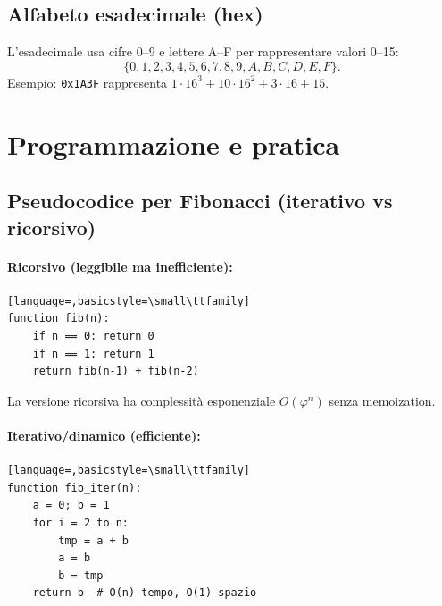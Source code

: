\documentclass[11pt,a4paper]{article}
\let\oldsection\section
\renewcommand{\section}{\clearpage\oldsection}
\begin{document}
\subsection{Alfabeto esadecimale (hex)}
L'esadecimale usa cifre 0--9 e lettere A--F per rappresentare valori 0--15:
\[
\{0,1,2,3,4,5,6,7,8,9,A,B,C,D,E,F\}.
\]
Esempio: \texttt{0x1A3F} rappresenta \(1\cdot 16^3 + 10\cdot 16^2 + 3\cdot 16 + 15\).


\section{Programmazione e pratica}

\subsection{Pseudocodice per Fibonacci (iterativo vs ricorsivo)}
\paragraph{Ricorsivo (leggibile ma inefficiente):}
\begin{lstlisting}[language=,basicstyle=\small\ttfamily]
function fib(n):
    if n == 0: return 0
    if n == 1: return 1
    return fib(n-1) + fib(n-2)
\end{lstlisting}
La versione ricorsiva ha complessità esponenziale \(O(\varphi^n)\) senza memoization.

\paragraph{Iterativo/dinamico (efficiente):}
\begin{lstlisting}[language=,basicstyle=\small\ttfamily]
function fib_iter(n):
    a = 0; b = 1
    for i = 2 to n:
        tmp = a + b
        a = b
        b = tmp
    return b  # O(n) tempo, O(1) spazio
\end{lstlisting}
\end{document}
